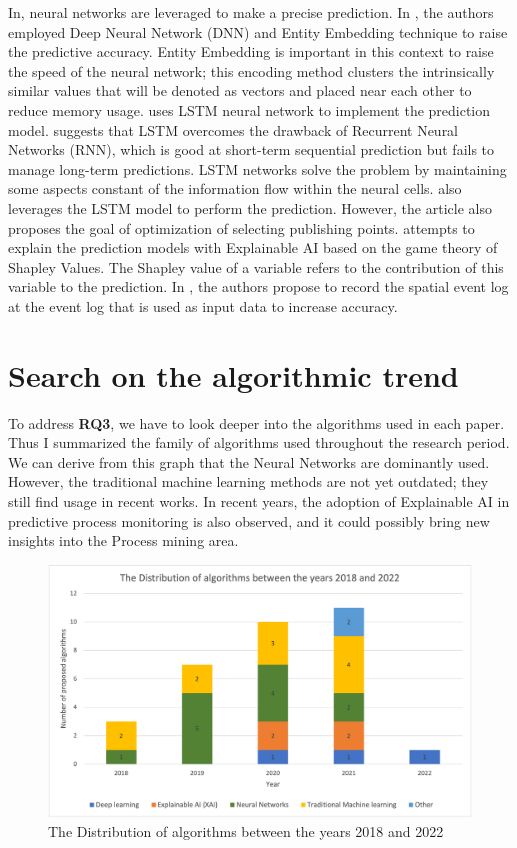 \documentclass[runningheads]{llncs}
\begin{document}
		In\cite{art-15}\cite{art-21}\cite{art-29}, neural networks are leveraged to make a precise prediction. In \cite{art-15}, the authors employed Deep Neural Network (DNN) and Entity Embedding technique to raise the predictive accuracy. Entity Embedding is important in this context to raise the speed of the neural network; this encoding method clusters the intrinsically similar values that will be denoted as vectors and placed near each other to reduce memory usage.  \cite{art-21} uses LSTM neural network to implement the prediction model. \cite{art-21} suggests that LSTM overcomes the drawback of Recurrent Neural Networks (RNN), which is good at short-term sequential prediction but fails to manage long-term predictions. LSTM networks solve the problem by maintaining some aspects constant of the information flow within the neural cells. \cite{art-29} also leverages the LSTM model to perform the prediction. However, the article also proposes the goal of optimization of selecting publishing points. \cite{art-17} attempts to explain the prediction models with Explainable AI based on the game theory of Shapley Values. The Shapley value of a variable refers to the contribution of this variable to the prediction. In \cite{art-13}, the authors propose to record the spatial event log at the event log that is used as input data to increase accuracy.       

				
		
		\section{Search on the algorithmic trend}
		
		To address \textbf{RQ3}, we have to look deeper into the algorithms used in each paper. Thus I summarized the family of algorithms used throughout the research period. We can derive from this graph that the Neural Networks are dominantly used. However, the traditional machine learning methods are not yet outdated; they still find usage in recent works. In recent years, the adoption of Explainable AI in predictive process monitoring is also observed, and it could possibly bring new insights into the Process mining area.       
		
		\begin{figure}
		\includegraphics[scale=0.4]{Distribution_algorithms.png}
		\centering
		\caption{The Distribution of algorithms between the years 2018 and 2022}
		\end{figure}
		
\end{document}
